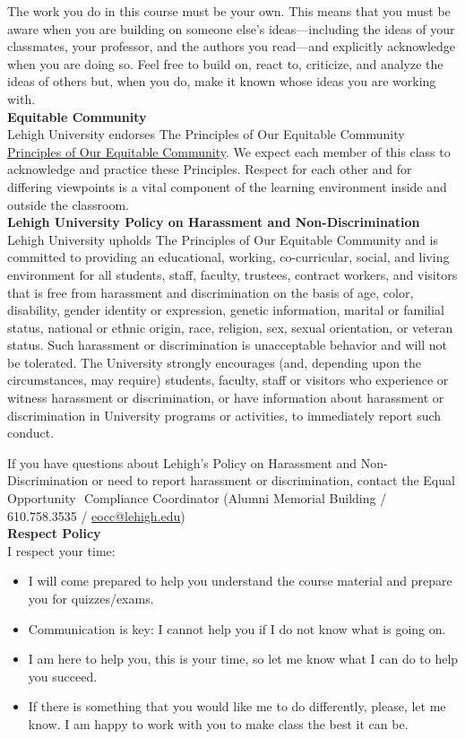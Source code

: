 \documentclass[11pt,letterpaper]{article}
\newcommand{\lefthead}[2]{\noindent\textbf{#1}\hfill\\[#2]}
\begin{document}
The work you do in this course must be your own. 
This means that you must be aware when you are building on someone else's ideas—including the ideas of your classmates, your professor, and the authors you read—and explicitly acknowledge when you are doing so.
Feel free to build on, react to, criticize, and analyze the ideas of others but, when you do, make it known whose ideas you are working with.\\[0.3cm]

\lefthead{Equitable Community}{0.3cm}
Lehigh University endorses The Principles of Our Equitable Community \href{http://www.lehigh.edu/~inprv/initiatives/PrinciplesEquity_Sheet_v2_032212.pdf}{Principles of Our Equitable Community}. We expect each member of this class to acknowledge and practice these Principles. Respect for each other and for differing viewpoints is a vital component of the learning environment inside and outside the classroom.
\\[0.3cm]

\lefthead{Lehigh University Policy on Harassment and Non-Discrimination}{0.3cm}
Lehigh University upholds The Principles of Our Equitable Community and is committed to providing an educational, working, co-curricular, social, and living environment for all students, staff, faculty, trustees, contract workers, and visitors that is free from harassment and discrimination on the basis of age, color, disability, gender identity or expression, genetic information, marital or familial status, national or ethnic origin, race, religion, sex, sexual orientation, or veteran status.  
Such harassment or discrimination is unacceptable behavior and will not be tolerated. The University strongly encourages (and, depending upon the circumstances, may require) students, faculty, staff or visitors who experience or witness harassment or discrimination, or have information about harassment or discrimination in University programs or activities, to immediately report such conduct. 
 
If you have questions about Lehigh’s Policy on Harassment and Non-Discrimination or need to report harassment or discrimination, contact the Equal Opportunity  Compliance Coordinator (Alumni Memorial Building / 610.758.3535 / \href{eocc@lehigh.edu}{eocc@lehigh.edu})
\\[0.3cm]

\lefthead{Respect Policy}{0.3 cm}
\noindent I respect your time:
\begin{itemize}
\item I will come prepared to help you understand the course material and prepare you for quizzes/exams.
\item Communication is key: I cannot help you if I do not know what is going on.
\item I am here to help you, this is your time, so let me know what I can do to help you succeed.
\item If there is something that you would like me to do differently, please, let me know. I am happy to work with you to make class the best it can be.
\end{itemize}
\end{document}

